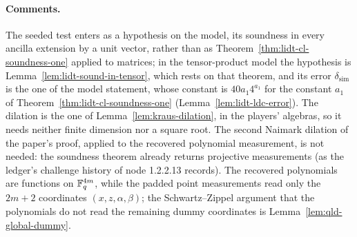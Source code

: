 \paragraph{Comments.} The seeded test enters as a hypothesis on the model, its soundness in every
ancilla extension by a unit vector, rather than as Theorem~\ref{thm:lidt-cl-soundness-one} applied
to matrices; in the tensor-product model the hypothesis is Lemma~\ref{lem:lidt-sound-in-tensor},
which rests on that theorem, and its error $\delta_{\mathrm{sim}}$ is the one of the model
statement, whose constant is $40 a_1 4^{a_1}$ for the constant $a_1$ of
Theorem~\ref{thm:lidt-cl-soundness-one} (Lemma~\ref{lem:lidt-ldc-error}). The dilation is the one
of Lemma~\ref{lem:kraus-dilation}, in the players' algebras, so it needs neither finite dimension
nor a square root. The second Naimark dilation of the paper's proof, applied to the recovered
polynomial measurement, is not needed: the soundness theorem already returns projective
measurements (as the ledger's challenge history of node 1.2.2.13 records). The recovered
polynomials are functions on $\mathbb{F}_q^{4m}$, while the padded point measurements read only the
$2m+2$ coordinates $(x, z, \alpha, \beta)$; the Schwartz--Zippel argument that the polynomials do
not read the remaining dummy coordinates is Lemma~\ref{lem:qld-global-dummy}.

